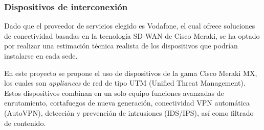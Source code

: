 

\subsubsection{Dispositivos de interconexión}
Dado que el proveedor de servicios elegido es Vodafone, el cual ofrece soluciones de conectividad basadas en la tecnología SD-WAN de Cisco Meraki, se ha optado por realizar una estimación técnica realista de los dispositivos que podrían instalarse en cada sede.

\newpage

\vspace{0.5cm}
En este proyecto se propone el uso de dispositivos de la gama Cisco Meraki MX, los cuales son \textit{appliances} de red de tipo UTM (Unified Threat Management). Estos dispositivos combinan en un solo equipo funciones avanzadas de enrutamiento, cortafuegos de nueva generación, conectividad VPN automática (AutoVPN), detección y prevención de intrusiones (IDS/IPS), así como filtrado de contenido.

%

